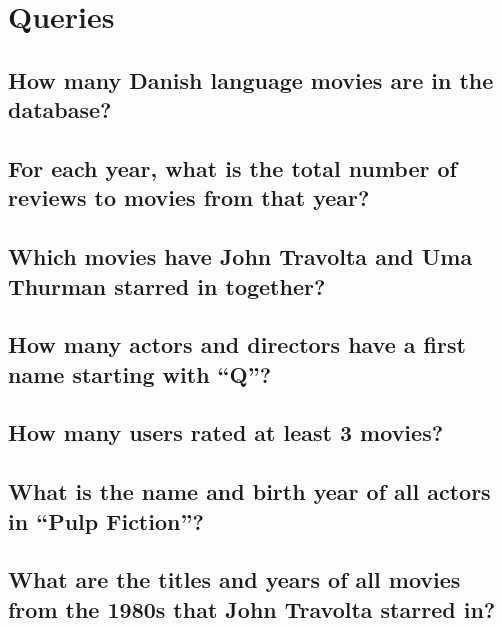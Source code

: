 \documentclass[a4paper,11pt]{memoir}
\begin{document}
\chapter{Queries}

\section{How many Danish language movies are in the database?}



\section{For each year, what is the total number of reviews to movies from that year?}



\section{Which movies have John Travolta and Uma Thurman starred in together?}



\section{How many actors and directors have a first name starting with ``Q''?}



\section{How many users rated at least 3 movies?}



\section{What is the name and birth year of all actors in ``Pulp Fiction''?}



\section{What are the titles and years of all movies from the 1980s that John Travolta starred in?}


\end{document}
